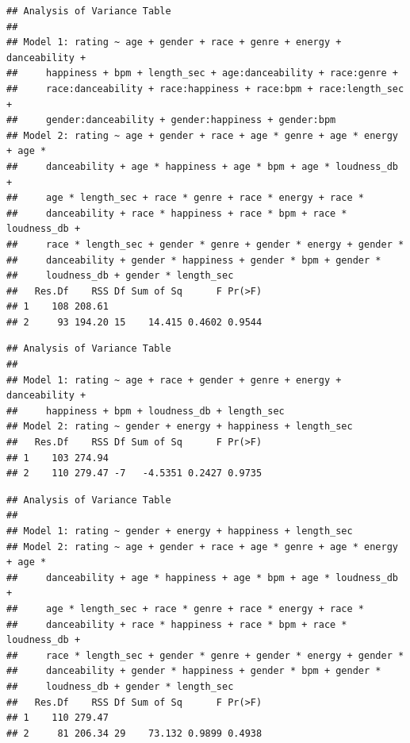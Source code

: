 \documentclass[
]{article}
\newenvironment{Shaded}{\begin{snugshade}}{\end{snugshade}}
\newcommand{\FunctionTok}[1]{\textcolor[rgb]{0.13,0.29,0.53}{\textbf{#1}}}
\newcommand{\NormalTok}[1]{#1}
\newcommand{\SpecialCharTok}[1]{\textcolor[rgb]{0.81,0.36,0.00}{\textbf{#1}}}
\newcommand{\StringTok}[1]{\textcolor[rgb]{0.31,0.60,0.02}{#1}}
\begin{document}
\begin{verbatim}
## Analysis of Variance Table
## 
## Model 1: rating ~ age + gender + race + genre + energy + danceability + 
##     happiness + bpm + length_sec + age:danceability + race:genre + 
##     race:danceability + race:happiness + race:bpm + race:length_sec + 
##     gender:danceability + gender:happiness + gender:bpm
## Model 2: rating ~ age + gender + race + age * genre + age * energy + age * 
##     danceability + age * happiness + age * bpm + age * loudness_db + 
##     age * length_sec + race * genre + race * energy + race * 
##     danceability + race * happiness + race * bpm + race * loudness_db + 
##     race * length_sec + gender * genre + gender * energy + gender * 
##     danceability + gender * happiness + gender * bpm + gender * 
##     loudness_db + gender * length_sec
##   Res.Df    RSS Df Sum of Sq      F Pr(>F)
## 1    108 208.61                           
## 2     93 194.20 15    14.415 0.4602 0.9544
\end{verbatim}

\begin{Shaded}
\end{Shaded}

\begin{verbatim}
## Analysis of Variance Table
## 
## Model 1: rating ~ age + race + gender + genre + energy + danceability + 
##     happiness + bpm + loudness_db + length_sec
## Model 2: rating ~ gender + energy + happiness + length_sec
##   Res.Df    RSS Df Sum of Sq      F Pr(>F)
## 1    103 274.94                           
## 2    110 279.47 -7   -4.5351 0.2427 0.9735
\end{verbatim}

\begin{Shaded}
\end{Shaded}

\begin{verbatim}
## Analysis of Variance Table
## 
## Model 1: rating ~ gender + energy + happiness + length_sec
## Model 2: rating ~ age + gender + race + age * genre + age * energy + age * 
##     danceability + age * happiness + age * bpm + age * loudness_db + 
##     age * length_sec + race * genre + race * energy + race * 
##     danceability + race * happiness + race * bpm + race * loudness_db + 
##     race * length_sec + gender * genre + gender * energy + gender * 
##     danceability + gender * happiness + gender * bpm + gender * 
##     loudness_db + gender * length_sec
##   Res.Df    RSS Df Sum of Sq      F Pr(>F)
## 1    110 279.47                           
## 2     81 206.34 29    73.132 0.9899 0.4938
\end{verbatim}
\end{document}
